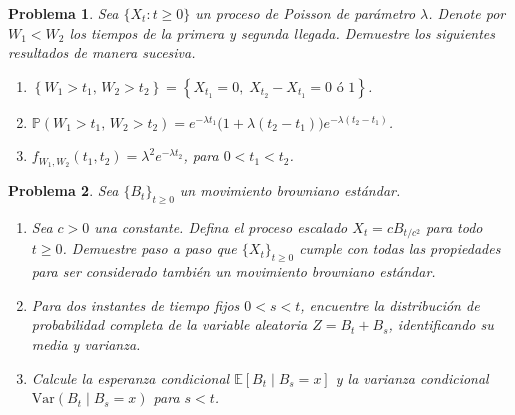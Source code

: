 \documentclass[12pt]{article}
\newtheorem{problem}{Problema}
\begin{document}
\begin{problem}
Sea $\{X_t : t \geq 0\}$ un proceso de Poisson de parámetro $\lambda$. Denote por $W_1 < W_2$ los
tiempos de la primera y segunda llegada. Demuestre los siguientes resultados de manera sucesiva.
\begin{enumerate}
    \item[(a)] $\left\{W_1 > t_1,\, W_2 > t_2\right\} = \left\{X_{t_1} = 0,\; X_{t_2} - X_{t_1} = 0 \text{ ó } 1\right \}$.
    \item[(b)] $\mathbb{P}(W_1 > t_1,\, W_2 > t_2) = e^{-\lambda t_1}\bigl(1 + \lambda(t_2-t_1)\bigr)e^{-\lambda(t_2-t_1)}$.
    \item[(c)] $f_{W_1,W_2}(t_1,t_2) = \lambda^2 e^{-\lambda t_2}$, \quad para $0 < t_1 < t_2$.
\end{enumerate}
\end{problem}

\begin{problem} Sea $\{B_t\}_{t \geq 0}$ un movimiento browniano estándar.
\begin{enumerate}
    \item[(a)] Sea $c > 0$ una constante. Defina el proceso escalado $X_t = c B_{t/c^2}$ para todo $t \geq 0$. Demuestre paso a paso que $\{X_t\}_{t \geq 0}$ cumple con todas las propiedades para ser considerado también un movimiento browniano estándar.
    \item[(b)] Para dos instantes de tiempo fijos $0 < s < t$, encuentre la distribución de probabilidad completa de la variable aleatoria $Z = B_t + B_s$, identificando su media y varianza.
    \item[(c)] Calcule la esperanza condicional $\mathbb{E}[B_t \mid B_s=x]$ y la varianza condicional $\mathrm{Var}(B_t \mid B_s=x)$ para $s < t$.
\end{enumerate}
\end{problem}
\end{document}
